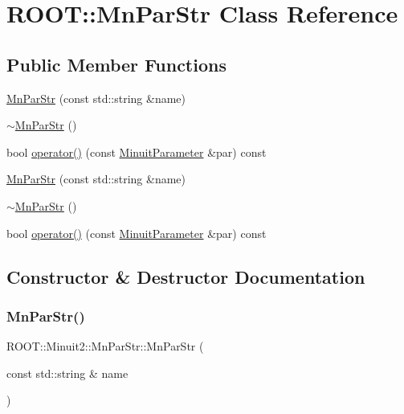 \hypertarget{classROOT_1_1Minuit2_1_1MnParStr}{}\section{R\+O\+OT\+:\+:Mn\+Par\+Str Class Reference}
\label{classROOT_1_1Minuit2_1_1MnParStr}
\subsection*{Public Member Functions}
\begin{DoxyCompactItemize}
\item 
\mbox{\hyperlink{classROOT_1_1Minuit2_1_1MnParStr_a2ef440b65a2b0fd06a40f11354984488}{Mn\+Par\+Str}} (const std\+::string \&name)
\item 
\mbox{\hyperlink{classROOT_1_1Minuit2_1_1MnParStr_ae846c5b1bcce986267a463929719e64c}{$\sim$\+Mn\+Par\+Str}} ()
\item 
bool \mbox{\hyperlink{classROOT_1_1Minuit2_1_1MnParStr_a34637805bbe12052e26f2eab37d23ff1}{operator()}} (const \mbox{\hyperlink{classROOT_1_1Minuit2_1_1MinuitParameter}{Minuit\+Parameter}} \&par) const
\item 
\mbox{\hyperlink{classROOT_1_1Minuit2_1_1MnParStr_a2ef440b65a2b0fd06a40f11354984488}{Mn\+Par\+Str}} (const std\+::string \&name)
\item 
\mbox{\hyperlink{classROOT_1_1Minuit2_1_1MnParStr_ae846c5b1bcce986267a463929719e64c}{$\sim$\+Mn\+Par\+Str}} ()
\item 
bool \mbox{\hyperlink{classROOT_1_1Minuit2_1_1MnParStr_a34637805bbe12052e26f2eab37d23ff1}{operator()}} (const \mbox{\hyperlink{classROOT_1_1Minuit2_1_1MinuitParameter}{Minuit\+Parameter}} \&par) const
\end{DoxyCompactItemize}


\subsection{Constructor \& Destructor Documentation}
\mbox{\label{classROOT_1_1Minuit2_1_1MnParStr_a2ef440b65a2b0fd06a40f11354984488}} 
\subsubsection{\texorpdfstring{MnParStr()}{MnParStr()}\hspace{0.1cm}{\footnotesize\ttfamily [1/2]}}
{\footnotesize\ttfamily R\+O\+O\+T\+::\+Minuit2\+::\+Mn\+Par\+Str\+::\+Mn\+Par\+Str (\begin{DoxyParamCaption}\item[{const std\+::string \&}]{name }\end{DoxyParamCaption})\hspace{0.3cm}{\ttfamily [inline]}}

